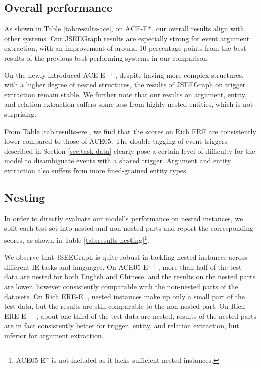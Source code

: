 \documentclass[11pt]{article}
\begin{document}
\subsection{Overall performance}

As shown in Table \ref{tab:results-ace}, on ACE-E$^+$, our overall results align with other systems. Our JSEEGraph results are especially strong for event argument extraction, with an improvement of around 10 percentage points from the best results of the previous best performing systems in our comparison.

On the newly introduced ACE-E$^{++}$, despite having more complex structures, with a higher degree of nested  structures, the results of JSEEGraph on trigger extraction remain stable. We further note that our results on argument, entity, and relation extraction suffers some loss from highly nested entities, which is not surprising. 

From Table \ref{tab:results-ere}, we find that the scores on Rich ERE are consistently lower compared to those of ACE05. The double-tagging of event triggers described in Section \ref{sec:task-data} clearly pose a certain level of difficulty for the model to disambiguate events with a shared trigger. Argument and entity extraction also suffers from more fined-grained entity types.

\subsection{Nesting}

In order to directly evaluate our model's performance on nested instances, we split each test set into nested and non-nested parts and report the corresponding scores, as shown in Table \ref{tab:results-nesting}\footnote{ACE05-E$^+$ is not included as it lacks sufficient nested instances.}. 

We observe that JSEEGraph is quite robust in tackling nested instances across different IE tasks and languages. On ACE05-E$^{++}$, more than half of the test data are nested for both English and Chinese, and the results on the nested parts are lower, however consistently comparable with the non-nested parts of the datasets. On Rich ERE-E$^{+}$, nested instances make up only a small part of the test data, but the results are still comparable to the non-nested part. On Rich ERE-E$^{++}$, about one third of the test data are nested, results of the nested parts are in fact consistently better for trigger, entity, and relation extraction, but inferior for argument extraction.
\end{document}
